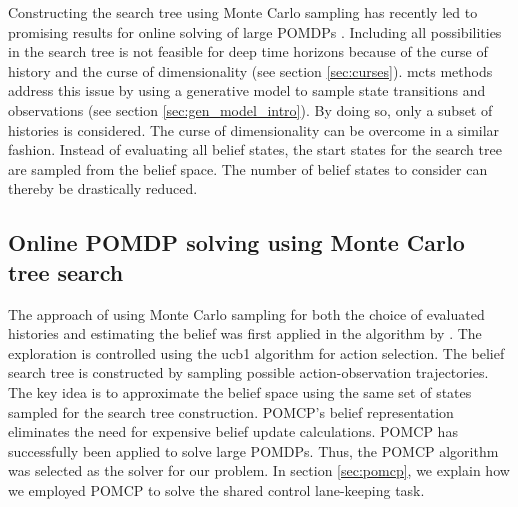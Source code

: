Constructing the search tree using Monte Carlo sampling has recently led to promising results for online solving of large POMDPs \parencite{pomcp}. Including all possibilities in the search tree is not feasible for deep time horizons because of the curse of history and the curse of dimensionality (see section \ref{sec:curses}). \gls{mcts} methods address this issue by using a generative model to sample state transitions and observations (see section \ref{sec:gen_model_intro}). By doing so, only a subset of histories is considered. The curse of dimensionality can be overcome in a similar fashion. Instead of evaluating all belief states, the start states for the search tree are sampled from the belief space. The number of belief states to consider can thereby be drastically reduced. 

\subsection{Online POMDP solving using Monte Carlo tree search}

The approach of using Monte Carlo sampling for both the choice of evaluated histories and estimating the belief was first applied in the  algorithm by \cite{pomcp}. The exploration is controlled using the \gls{ucb1} \parencite{ucb1} algorithm for action selection. The belief search tree is constructed by sampling possible action-observation trajectories. The key idea is to approximate the belief space using the same set of states sampled for the search tree construction. POMCP's belief representation eliminates the need for expensive belief update calculations. POMCP has successfully been applied to solve large POMDPs. Thus, the POMCP algorithm was selected as the solver for our problem. In section \ref{sec:pomcp}, we explain how we employed POMCP to solve the shared control lane-keeping task. 

